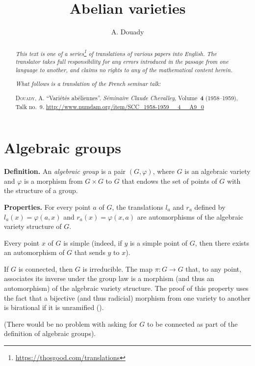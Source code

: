 \documentclass{article}
\title{Abelian varieties}
\author{A. Douady}
\date{}
\newcommand{\doctype}{French seminar talk}
\newcommand{\origcit}{%
  \textsc{Douady, A.}
  ``Vari\'{e}t\'{e}s ab\'{e}liennes''.
  \emph{S\'{e}minaire Claude Chevalley}, Volume~\textbf{4} (1958--1959), Talk no.~9.
  {\url{http://www.numdam.org/item/SCC_1958-1959__4__A9_0}}%
}
\newenvironment{rmenv}[1]
  {\phantomsection\par\medskip\noindent\textbf{#1.}\rmfamily}
  {\medskip}
\newcommand{\oldpage}[1]{\marginpar{\footnotesize$\Big\vert$ \textit{p.~#1}}}
\begin{document}
\maketitle
\thispagestyle{fancy}

\renewcommand{\abstractname}{Translator's note.}

\begin{abstract}
  \renewcommand*{\thefootnote}{\fnsymbol{footnote}}
  \emph{This text is one of a series\footnote{\url{https://thosgood.com/translations}} of translations of various papers into English.}
  \emph{The translator takes full responsibility for any errors introduced in the passage from one language to another, and claims no rights to any of the mathematical content herein.}

  \medskip
  
  \emph{What follows is a translation of the \doctype:}

  \medskip\noindent
  \origcit
\end{abstract}

\setcounter{footnote}{0}

\tableofcontents



\section{Algebraic groups}
\label{1}

\oldpage{9-01}
\begin{rmenv}{Definition}
  An \emph{algebraic group} is a pair $(G,\varphi)$, where $G$ is an algebraic variety and $\varphi$ is a morphism from $G\times G$ to $G$ that endows the set of points of $G$ with the structure of a group.
\end{rmenv}

\begin{rmenv}{Properties}
  For every point $a$ of $G$, the translations $l_a$ and $r_a$ defined by $l_a(x)=\varphi(a,x)$ and $r_a(x)=\varphi(x,a)$ are automorphisms of the algebraic variety structure of $G$.

  Every point $x$ of $G$ is simple (indeed, if $y$ is a simple point of $G$, then there exists an automorphism of $G$ that sends $y$ to $x$).

  If $G$ is connected, then $G$ is irreducible.
  The map $\pi\colon G\to G$ that, to any point, associates its inverse under the group law is a morphism (and thus an automorphism) of the algebraic variety structure.
  The proof of this property uses the fact that a bijective (and thus radicial) morphism from one variety to another is birational if it is unramified (\cite[p.~211, Corollary~2 to Proposition~3, Section~II, Chapter~VI]{1}).

  (There would be no problem with asking for $G$ to be connected as part of the definition of algebraic groups).
\end{rmenv}
\end{document}
